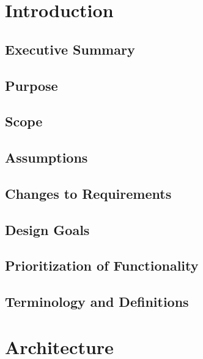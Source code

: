 \documentclass{report}
\begin{document}

\tableofcontents
\listoffigures

\chapter{Introduction} %
\label{ch:introduction}

\section{Executive Summary}

\section{Purpose}

\section{Scope}

\section{Assumptions}

\section{Changes to Requirements}

\section{Design Goals}

\section{Prioritization of Functionality}

\section{Terminology and Definitions}


\chapter{Architecture} %
\label{ch:architecture}
\end{document}
